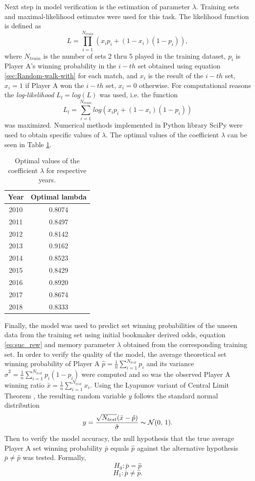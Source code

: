 \documentclass{easychair}
\begin{document}
Next step in model verification is the estimation of parameter $\lambda$.
Training sets and maximal-likelihood estimates were used for this
task. The likelihood function is defined as 
\[
L=\prod_{i=1}^{N_{train}}(x_{i}p_{i}+(1-x_{i})(1-p_{i})),
\]
where $N_{train}$ is the number of sets 2 thru 5 played in the training
dataset, $p_{i}$ is Player A's winning probability in the $i-th$
set obtained using equation \ref{sec:Random-walk-with} for each match,
and $x_{i}$ is the result of the $i-th$ set, $x_{i}=1$ if Player
A won the $i-th$ set, $x_{i}=0$ otherwise. For computational reasons
the \emph{log-likelihood }$L_{l}=log(L)$ was used, i.e. the function
\[
L_{l}=\sum_{i=1}^{N_{train}}log(x_{i}p_{i}+(1-x_{i})(1-p_{i}))
\]
was maximized. Numerical methods implemented in Python library SciPy
were used to obtain specific values of $\lambda$. The optimal values
of the coefficient $\lambda$ can be seen in Table \ref{tab:Optimal-values-of}.

\begin{table}
\begin{centering}
\begin{tabular}{|c|c|}
\hline 
Year & Optimal lambda\tabularnewline
\hline 
\hline 
2010 & 0.8074\tabularnewline
\hline 
2011 & 0.8497\tabularnewline
\hline 
2012 & 0.8142\tabularnewline
\hline 
2013 & 0.9162\tabularnewline
\hline 
2014 & 0.8523\tabularnewline
\hline 
2015 & 0.8429\tabularnewline
\hline 
2016 & 0.8920\tabularnewline
\hline 
2017 & 0.8674\tabularnewline
\hline 
2018 & 0.8333\tabularnewline
\hline 
\end{tabular}
\par\end{centering}
\caption{\label{tab:Optimal-values-of}Optimal values of the coefficient $\lambda$
for respective years.}

\end{table}

Finally, the model was used to predict set winning probabilities of
the unseen data from the training set using initial bookmaker derived
odds, equation \ref{eq:suc_rew} and memory parameter $\lambda$ obtained
from the corresponding training set. In order to verify the quality
of the model, the average theoretical set winning probability of Player
A $\hat{p}=\frac{1}{n}\sum_{i=1}^{N_{test}}p_{i}$ and its variance
$\hat{\sigma}^{2}=\frac{1}{n}\sum_{i=1}^{N_{test}}p_{i}(1-p_{i})$
were computed and so was the observed Player A winning ratio $\bar{x}=\frac{1}{n}\sum_{i=1}^{N_{test}}x_{i}$.
Using the Lyapunov variant of Central Limit Theorem \cite{billingsley1995probability},
the resulting random variable $y$ follows the standard normal distribution
\[
y=\frac{\sqrt{N_{test}}(\bar{x}-\hat{p})}{\hat{\sigma}}\thicksim\mathcal{N}(0,\,1).
\]
Then to verify the model accuracy, the null hypothesis that
the true average Player A set winning probability $\bar{p}$ equals
$\hat{p}$ against the alternative hypothesis $\bar{p}\neq\hat{p}$
was tested. Formally, 
\[
H_{0}:\bar{p}=\hat{p}
\]
\[
H_{1}:\bar{p}\neq\hat{p}.
\]
\end{document}
